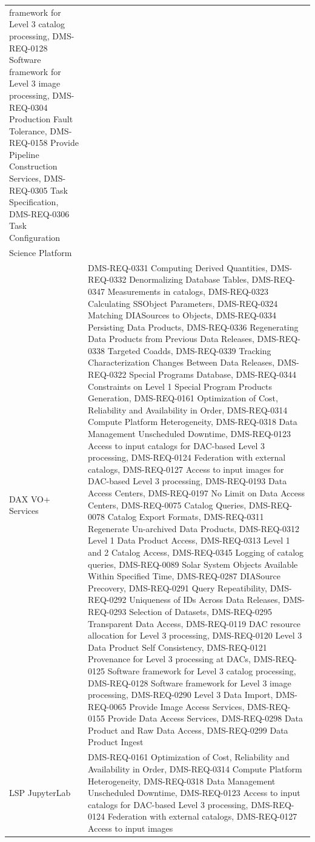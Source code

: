 \documentclass[]{article}
\begin{document}
\begin{longtable}[]{@{}ll@{}}
framework for Level 3 catalog processing, DMS-REQ-0128 Software
framework for Level 3 image processing, DMS-REQ-0304 Production Fault
Tolerance, DMS-REQ-0158 Provide Pipeline Construction Services,
DMS-REQ-0305 Task Specification, DMS-REQ-0306 Task
Configuration\tabularnewline
Science Platform &\tabularnewline
DAX VO+ Services & DMS-REQ-0331 Computing Derived Quantities,
DMS-REQ-0332 Denormalizing Database Tables, DMS-REQ-0347 Measurements in
catalogs, DMS-REQ-0323 Calculating SSObject Parameters, DMS-REQ-0324
Matching DIASources to Objects, DMS-REQ-0334 Persisting Data Products,
DMS-REQ-0336 Regenerating Data Products from Previous Data Releases,
DMS-REQ-0338 Targeted Coadds, DMS-REQ-0339 Tracking Characterization
Changes Between Data Releases, DMS-REQ-0322 Special Programs Database,
DMS-REQ-0344 Constraints on Level 1 Special Program Products Generation,
DMS-REQ-0161 Optimization of Cost, Reliability and Availability in
Order, DMS-REQ-0314 Compute Platform Heterogeneity, DMS-REQ-0318 Data
Management Unscheduled Downtime, DMS-REQ-0123 Access to input catalogs
for DAC-based Level 3 processing, DMS-REQ-0124 Federation with external
catalogs, DMS-REQ-0127 Access to input images for DAC-based Level 3
processing, DMS-REQ-0193 Data Access Centers, DMS-REQ-0197 No Limit on
Data Access Centers, DMS-REQ-0075 Catalog Queries, DMS-REQ-0078 Catalog
Export Formats, DMS-REQ-0311 Regenerate Un-archived Data Products,
DMS-REQ-0312 Level 1 Data Product Access, DMS-REQ-0313 Level 1 and 2
Catalog Access, DMS-REQ-0345 Logging of catalog queries, DMS-REQ-0089
Solar System Objects Available Within Specified Time, DMS-REQ-0287
DIASource Precovery, DMS-REQ-0291 Query Repeatibility, DMS-REQ-0292
Uniqueness of IDs Across Data Releases, DMS-REQ-0293 Selection of
Datasets, DMS-REQ-0295 Transparent Data Access, DMS-REQ-0119 DAC
resource allocation for Level 3 processing, DMS-REQ-0120 Level 3 Data
Product Self Consistency, DMS-REQ-0121 Provenance for Level 3 processing
at DACs, DMS-REQ-0125 Software framework for Level 3 catalog processing,
DMS-REQ-0128 Software framework for Level 3 image processing,
DMS-REQ-0290 Level 3 Data Import, DMS-REQ-0065 Provide Image Access
Services, DMS-REQ-0155 Provide Data Access Services, DMS-REQ-0298 Data
Product and Raw Data Access, DMS-REQ-0299 Data Product
Ingest\tabularnewline
LSP JupyterLab & DMS-REQ-0161 Optimization of Cost, Reliability and
Availability in Order, DMS-REQ-0314 Compute Platform Heterogeneity,
DMS-REQ-0318 Data Management Unscheduled Downtime, DMS-REQ-0123 Access
to input catalogs for DAC-based Level 3 processing, DMS-REQ-0124
Federation with external catalogs, DMS-REQ-0127 Access to input images

\end{longtable}
\end{document}
